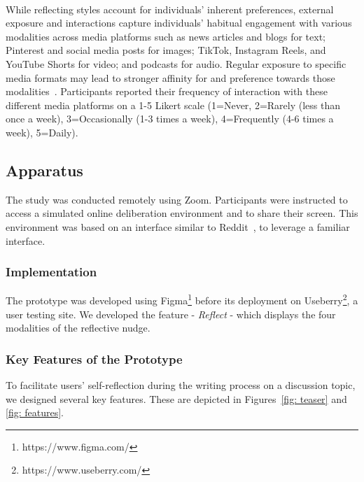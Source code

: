 \paragraph{} While reflecting styles account for individuals' inherent preferences, external exposure and interactions capture individuals' habitual engagement with various modalities across media platforms such as news articles and blogs for text; Pinterest and social media posts for images; TikTok, Instagram Reels, and YouTube Shorts for video; and podcasts for audio. Regular exposure to specific media formats may lead to stronger affinity for and preference towards those modalities~\cite{knobloch2014choice}. Participants reported their frequency of interaction with these different media platforms on a 1-5 Likert scale (1=Never, 2=Rarely (less than once a week), 3=Occasionally (1-3 times a week), 4=Frequently (4-6 times a week), 5=Daily).

\subsection{Apparatus}
The study was conducted remotely using Zoom. Participants were instructed to access a simulated online deliberation environment and to share their screen. This environment was based on an interface similar to Reddit~\cite{horne2017identifying, medvedev2019anatomy}, to leverage a familiar interface.

\subsubsection{Implementation}
The prototype was developed using Figma\footnote{https://www.figma.com/} before its deployment on Useberry\footnote{https://www.useberry.com/}, a user testing site. We developed the feature - \textit{Reflect} - which displays the four modalities of the reflective nudge.

\subsubsection{Key Features of the Prototype}
To facilitate users' self-reflection during the writing process on a discussion topic, we designed several key features. These are depicted in Figures~\ref{fig: teaser} and \ref{fig: features}.

